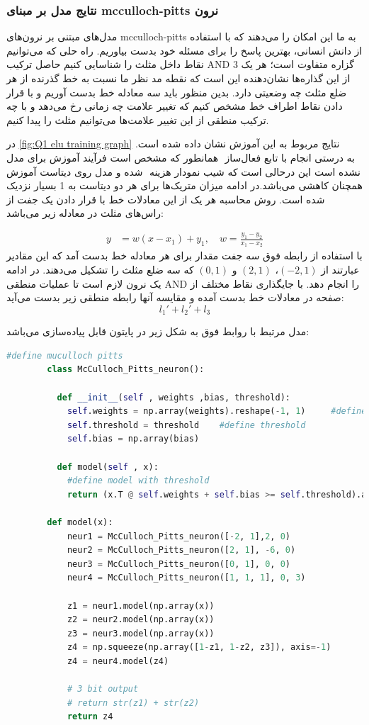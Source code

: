 \documentclass{article}
\begin{document}
\subsubsection{نتایج مدل بر مبنای mcculloch-pitts نرون}

مدل‌های مبتنی بر نرون‌های mcculloch-pitts به ما این امکان را می‌دهند که با استفاده از دانش انسانی، بهترین پاسخ را برای مسئله خود بدست بیاوریم. راه حلی که می‌توانیم نقاط داخل مثلث را شناسایی کنیم حاصل ترکیب AND 3 گزاره متفاوت است؛ هر یک از این گذاره‌ها نشان‌دهنده این است که نقطه مد نظر ما نسبت به خط گذرنده از هر ضلع مثلث چه وضعیتی دارد. بدین منظور باید سه معادله خط بدست آوریم و با قرار دادن نقاط اطراف خط مشخص کنیم که تغییر علامت چه زمانی رخ می‌دهد و با چه ترکیب منطقی از این تغییر علامت‌ها می‌توانیم مثلث را پیدا کنیم.
 

در ‎‎\autoref{fig:Q1 elu training graph}‎ نتایج مربوط به این آموزش نشان داده شده است. همانطور که مشخص است فرآیند آموزش برای مدل ‎ با تابع فعال‌ساز ‎به درستی انجام شده و مدل روی دیتاست آموزش ‎ نشده است این درحالی است که شیب نمودار هزینه همچنان کاهشی می‌باشد.در ادامه میزان متریک‌ها برای هر دو دیتاست به 1 بسیار نزدیک شده است.
روش محاسبه هر یک از این معادلات خط با قرار دادن یک جفت از راس‌های مثلث در معادله زیر می‌باشد:

\begin{align}
y &= w(x-x_1)+y_1 ,\quad w = \frac{y_1-y_2}{x_1-x_2}
\end{align}
با استفاده از رابطه فوق سه جفت مقدار برای هر معادله خط بدست آمد که این مقادیر عبارتند از
$(-2,1)$، $(2,1)$ و $(0,1)$
که سه ضلع مثلث را تشکیل می‌دهند. در ادامه یک نرون لازم است تا عملیات منطقی AND را انجام دهد. با جایگذاری نقاط مختلف از صفحه در معادلات خط بدست آمده و مقایسه آنها رابطه منطقی زیر بدست می‌آید:
$$l_1'+l_2'+l_3$$

مدل مرتبط با روابط فوق به شکل زیر در پایتون قابل پیاده‌سازی می‌باشد:
 \begin{LTR}
 	\begin{lstlisting}[language=Python, caption=حلقه آموزش]
		#define muculloch pitts
		class McCulloch_Pitts_neuron():
		
		  def __init__(self , weights ,bias, threshold):
		    self.weights = np.array(weights).reshape(-1, 1)     #define weights
		    self.threshold = threshold    #define threshold
		    self.bias = np.array(bias)
		    
		  def model(self , x):
		    #define model with threshold
		    return (x.T @ self.weights + self.bias >= self.threshold).astype(int)
		    
		def model(x):
		    neur1 = McCulloch_Pitts_neuron([-2, 1],2, 0)
		    neur2 = McCulloch_Pitts_neuron([2, 1], -6, 0)
		    neur3 = McCulloch_Pitts_neuron([0, 1], 0, 0)
		    neur4 = McCulloch_Pitts_neuron([1, 1, 1], 0, 3)
		
		    z1 = neur1.model(np.array(x))
		    z2 = neur2.model(np.array(x))
		    z3 = neur3.model(np.array(x))
		    z4 = np.squeeze(np.array([1-z1, 1-z2, z3]), axis=-1)
		    z4 = neur4.model(z4)
		
		    # 3 bit output
		    # return str(z1) + str(z2)
		    return z4
		
 	\end{lstlisting}
 \end{LTR}
\end{document}
